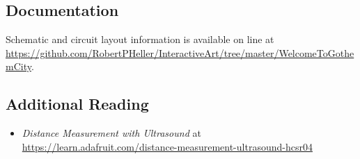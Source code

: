\subsection*{Documentation}


Schematic and circuit layout information is available on line at 
\url{https://github.com/RobertPHeller/InteractiveArt/tree/master/WelcomeToGothemCity}.

\subsection*{Additional Reading}

\begin{itemize}
\item \textit{Distance Measurement with Ultrasound} at 
\url{https://learn.adafruit.com/distance-measurement-ultrasound-hcsr04} 
\end{itemize}

